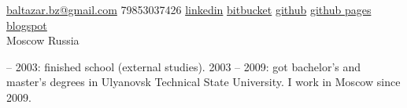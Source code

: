 \documentclass[unicode, 10pt, a4paper, oneside, fleqn]{article}
\begin{document}
\sloppy  %


\nobreakvspace{0.3em}  %

\noindent\href{mailto:baltazar.dot.bz.at.gmail.dot.com}{baltazar.bz\mbox{}@\mbox{}gmail.com}\sbull
\textsmaller{+}79853037426\sbull
\href{http://ru.linkedin.com/pub/yuri-bochkarev/21/3a9/555}{linkedin}
\sbull
\href{https://bitbucket.org/balta2ar}{bitbucket}
\sbull
\href{https://github.com/balta2ar}{github}
\sbull
\href{http://balta2ar.github.com}{github pages}
\sbull
\href{http://baltazar-bz.blogspot.com/}{blogspot}
\\
Moscow\sbull
Russia
\spacedhrule{0.8em}{-0.4em}  %


\vspace{0em}  %

 -- 2003: finished school (external studies).
2003 -- 2009: got bachelor's and master's degrees in Ulyanovsk Technical State
University. I work in Moscow since 2009.
\spacedhrule{0.6em}{-0.4em}

\end{document}
